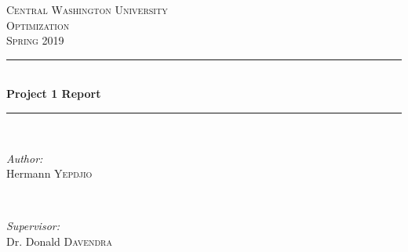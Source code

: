 \documentclass[12pt]{article}
\begin{document}
	
	\begin{titlepage}
		
		\newcommand{\HRule}{\rule{\linewidth}{0.5mm}} %
		
		\center %
		
		
		\textsc{\LARGE Central Washington University}\\[1.5cm] %
		\textsc{\Large Optimization}\\[0.5cm] %
		\textsc{\large Spring 2019}\\[0.5cm] %
		
		
		\HRule \\[0.4cm]
		{ \huge \bfseries Project 1 Report}\\[0.4cm] %
		\HRule \\[1.5cm]
		
		
		\begin{minipage}{0.4\textwidth}
			\begin{flushleft} \large
				\emph{Author:}\\
				Hermann \textsc{Yepdjio} %
			\end{flushleft}
		\end{minipage}
		~
		\begin{minipage}{0.4\textwidth}
			\begin{flushright} \large
				\emph{Supervisor:} \\
				Dr. Donald \textsc{Davendra} %
			\end{flushright}
		\end{minipage}\\[1cm]
		

\end{titlepage}
\end{document}
